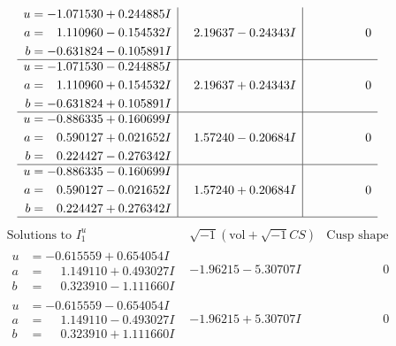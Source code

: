 \documentclass[1p]{elsarticle_modified}
\theoremstyle{definition}
\newcommand{\I}{\sqrt{-1}}
\begin{document}
$$\begin{array}{c|c|c}
\begin{aligned}
u &= -1.071530 + 0.244885 I \\
a &= \phantom{-}1.110960 - 0.154532 I \\
b &= -0.631824 - 0.105891 I\end{aligned}
 & \phantom{-}2.19637 - 0.24343 I & \phantom{-0.000000 } 0 \\ \hline\begin{aligned}
u &= -1.071530 - 0.244885 I \\
a &= \phantom{-}1.110960 + 0.154532 I \\
b &= -0.631824 + 0.105891 I\end{aligned}
 & \phantom{-}2.19637 + 0.24343 I & \phantom{-0.000000 } 0 \\ \hline\begin{aligned}
u &= -0.886335 + 0.160699 I \\
a &= \phantom{-}0.590127 + 0.021652 I \\
b &= \phantom{-}0.224427 - 0.276342 I\end{aligned}
 & \phantom{-}1.57240 - 0.20684 I & \phantom{-0.000000 } 0 \\ \hline\begin{aligned}
u &= -0.886335 - 0.160699 I \\
a &= \phantom{-}0.590127 - 0.021652 I \\
b &= \phantom{-}0.224427 + 0.276342 I\end{aligned}
 & \phantom{-}1.57240 + 0.20684 I & \phantom{-0.000000 } 0\\
 \hline 
 \end{array}$$\newpage$$\begin{array}{c|c|c}  
\text{Solutions to }I^u_{1}& \I (\text{vol} + \sqrt{-1}CS) & \text{Cusp shape}\\
 \hline 
\begin{aligned}
u &= -0.615559 + 0.654054 I \\
a &= \phantom{-}1.149110 + 0.493027 I \\
b &= \phantom{-}0.323910 - 1.111660 I\end{aligned}
 & -1.96215 - 5.30707 I & \phantom{-0.000000 } 0 \\ \hline\begin{aligned}
u &= -0.615559 - 0.654054 I \\
a &= \phantom{-}1.149110 - 0.493027 I \\
b &= \phantom{-}0.323910 + 1.111660 I\end{aligned}
 & -1.96215 + 5.30707 I & \phantom{-0.000000 } 0 \\ \hline\begin{aligned}

\end{aligned}
\end{array}$$
\end{document}
